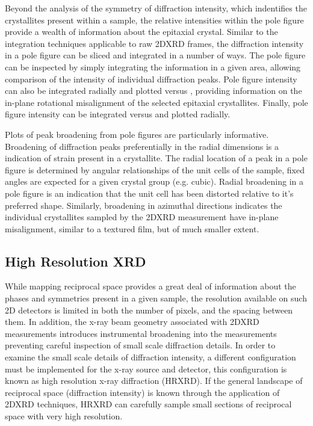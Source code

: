 Beyond the analysis of the symmetry of diffraction intensity, which indentifies the crystallites present within a sample, the relative intensities within the pole figure provide a wealth of information about the epitaxial crystal. Similar to the integration techniques applicable to raw 2DXRD frames, the diffraction intensity in a pole figure can be sliced and integrated in a number of ways. The pole figure can be inspected by simply integrating the information in a given area, allowing comparison of the intensity of individual diffraction peaks. Pole figure intensity can also be integrated radially and plotted versus \textphi{}, providing information on the in-plane rotational misalignment of the selected epitaxial crystallites. Finally, pole figure intensity can be integrated versus \textphi{} and plotted radially.

Plots of peak broadening from pole figures are particularly informative. Broadening of diffraction peaks preferentially in the radial dimensions is a indication of strain present in a crystallite. The radial location of a peak in a pole figure is determined by angular relationships of the unit cells of the sample, fixed angles are expected for a given crystal group (e.g. cubic). Radial broadening in a pole figure is an indication that the unit cell has been distorted relative to it's preferred shape. Similarly, broadening in azimuthal directions indicates the individual crystallites sampled by the 2DXRD measurement have in-plane misalignment, similar to a textured film, but of much smaller extent.

\subsection{High Resolution XRD}
While mapping reciprocal space provides a great deal of information about the phases and symmetries present in a given sample, the resolution available on such 2D detectors is limited in both the number of pixels, and the spacing between them. In addition, the x-ray beam geometry associated with 2DXRD measurements introduces instrumental broadening into the measurements preventing careful inspection of small scale diffraction details. In order to examine the small scale details of diffraction intensity, a different configuration must be implemented for the x-ray source and detector, this configuration is known as high resolution x-ray diffraction (HRXRD). If the general landscape of reciprocal space (diffraction intensity) is known through the application of 2DXRD techniques, HRXRD can carefully sample small sections of reciprocal space with very high resolution.

